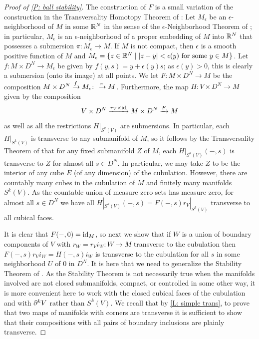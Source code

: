 \begin{proof}[Proof of \cref{P: ball stability}]
The construction of $F$ is a small variation of the construction in the Transversality Homotopy Theorem of \cite[Section 2.3]{GuPo74}:
Let $M_\epsilon$ be an $\epsilon$-neighborhood of $M$ in some $\mathbb{R}^N$ in the sense of the $\epsilon$-Neighborhood Theorem of \cite[Section 2.3]{GuPo74}; in particular,
$M_\epsilon$ is an $\epsilon$-neighborhood of a proper embedding of $M$ into $\mathbb{R}^N$ that possesses a submersion $\pi: M_\epsilon \to M$. If $M$ is not compact, then $\epsilon$ is a smooth positive function of $M$ and $M_\epsilon = \{z \in \mathbb{R}^N\mid |z-y|<\epsilon(y) \text{ for some }y \in M\}$. Let $f: M \times D^N \to M_\epsilon$ be given by $f(y, s) = y + \epsilon(y) s$; as $\epsilon(y)>0$, this is clearly a submersion (onto its image) at all points.
We let $F \colon M \times D^N \to M$ be the composition $M \times D^N \xrightarrow{f}M_\epsilon\colon\xrightarrow{\pi}M$.
Furthermore, the map $H \colon V \times D^N \to M$ given by the composition $$V \times D^N \xrightarrow{r_V \times \mathrm{id}} M \times D^N \xrightarrow{F} M$$ as well as all the restrictions $H|_{S^k(V)}$
are submersions.
In particular, each $H|_{S^k(V)}$ is transverse to any submanifold of $M$, so it follows by the Transversality Theorem of \cite[Section 2.3]{GuPo74} that for any fixed submanifold $Z$ of $M$, each $H|_{S^k(V)}(-,s)$ is transverse to $Z$ for almost all $s \in D^N$. In particular, we may take $Z$ to be the interior of any cube $E$ (of any dimension) of the cubulation. However, there are countably many cubes in the cubulation of $M$ and finitely many manifolds $S^k(V)$. As the countable union of measure zero sets has measure zero, for almost all $s \in D^N$ we have all $H|_{S^k(V)}(-,s) = F(-,s)r_V|_{S^k(V)}$ transverse to all cubical faces.

It is clear that $F(-,0) = \mathrm{id}_M$, so next we show that if $W$ is a union of boundary components of $V$ with $r_W = r_Vi_W \colon W \to M$ transverse to the cubulation then $F(-,s)r_Vi_W = H(-,s)i_W$ is transverse to the cubulation for all $s$ in some neighborhood $U$ of $0$ in $D^N$. It is here that we need to generalize the Stability Theorem of \cite[Section 1.6]{GuPo74}. As the Stability Theorem is not necessarily true when the manifolds involved are not closed submanifolds, compact, or controlled in some other way, it is more convenient here to work with the closed cubical faces of the cubulation and with $\partial^kV$ rather than $S^k(V)$. We recall that by \cref{L: simple trans}, to prove that two maps of manifolds with corners are transverse it is sufficient to show that their compositions with all pairs of boundary inclusions are plainly transverse.



\end{proof}
